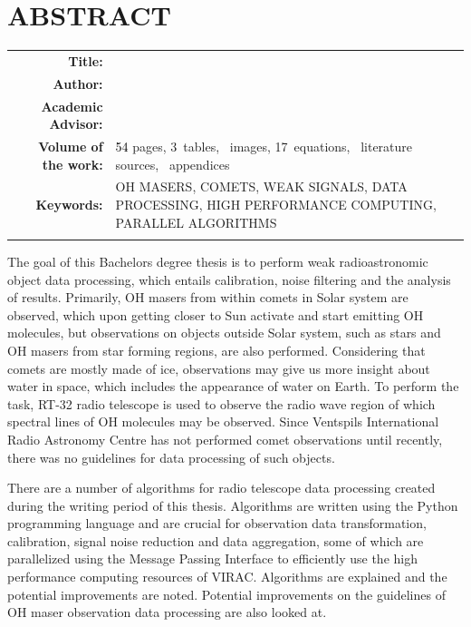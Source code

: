 \documentclass[12pt,paper=a4]{report}
\newcounter{nofappendices}
\begin{document}
\onehalfspace
{
\chapter*{ABSTRACT}

\begin{tabular}{@{}r@{}l@{}}
\parbox[c]{0.3\textwidth}{\textbf{Title:}}&
\parbox[t]{0.65\textwidth}{} \\
\parbox[c]{0.3\textwidth}{\textbf{Author:}}&
\parbox[t]{0.65\textwidth}{} \\
\parbox[c]{0.3\textwidth}{\textbf{Academic Advisor:}}&
\parbox[t]{0.65\textwidth}{} \\
\parbox[c]{0.3\textwidth}{\textbf{Volume of the work:}}&
\parbox[t]{0.65\textwidth}{\textcolor{black}{54} pages, 3~tables,  ~images, 17~equations, ~literature sources, ~appendices} \\
\parbox[c]{0.3\textwidth}{\textbf{Keywords:}}&
\parbox[t]{0.65\textwidth}{ OH MASERS, COMETS, WEAK SIGNALS, DATA PROCESSING, HIGH PERFORMANCE COMPUTING, PARALLEL ALGORITHMS} \\
&\\
\end{tabular}



The goal of this Bachelors degree thesis is to perform weak radioastronomic object data processing, which entails calibration, noise filtering and the analysis of results.  Primarily, OH masers from within comets in Solar system are observed, which upon getting closer to Sun activate and start emitting OH molecules, but observations on objects outside Solar system, such as stars and OH masers from star forming regions, are also performed. Considering that comets are mostly made of ice, observations may give us more insight about water in space, which includes the appearance of water on Earth. To perform the task, RT-32 radio telescope is used to observe the radio wave region of which spectral lines of OH molecules may be observed.  Since Ventspils International Radio Astronomy Centre has not performed comet observations until recently, there was no guidelines for data processing of such objects.  

There are a number of algorithms for radio telescope data processing created during the writing period of this thesis. Algorithms are written using the Python programming language and are crucial for observation data transformation, calibration, signal noise reduction and data aggregation, some of which are parallelized using the Message Passing Interface to efficiently use the high performance computing resources of VIRAC. Algorithms are explained and the potential improvements are noted. Potential improvements on the guidelines of OH maser observation data processing are also looked at.

}
\end{document}
